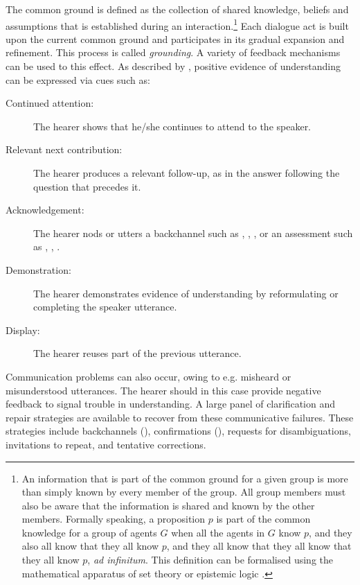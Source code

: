 The common ground is defined as the collection of shared knowledge, beliefs and assumptions that is established during an interaction.\footnote{An information that is part of the common ground for a given group is more than simply known by every member of the group.  All group members must also be aware that the information is shared and known by the other members. Formally speaking, a proposition $p$ is part of the common knowledge for a group of agents $G$ when all the agents in $G$ know $p$, and they also all know that they all know $p$, and they all know that they all know that they all know $p$, \textit{ad infinitum}. This definition can be formalised using the mathematical apparatus of set theory or epistemic logic \citep{meyer2004epistemic}. } Each dialogue act is built upon the current common ground and participates in its gradual expansion and refinement.  This process is called \textit{grounding}.  A variety of feedback mechanisms  can be used to this effect.  As described by \cite{Clark1989}, positive evidence of understanding can be expressed via cues such as:
\begin{description}
\item[Continued attention: ] The hearer shows that he/she continues to attend to the speaker.
\item[Relevant next contribution: ] The hearer produces a relevant follow-up, as in the answer  following the question that precedes it.
\item [Acknowledgement: ] The hearer nods or utters a backchannel such as , , , or an assessment such as , , .
\item [Demonstration: ] The hearer demonstrates evidence of understanding by reformulating or completing the speaker utterance.
\item [Display: ] The hearer reuses part of the previous utterance.
\end{description}

Communication problems can also occur, owing to e.g. misheard or misunderstood utterances. The hearer should in this case provide negative feedback to signal trouble in understanding. A large panel of clarification and repair strategies  are available to recover from these communicative failures.  These strategies include backchannels (), confirmations  (), requests for disambiguations, invitations to repeat, and tentative corrections.  

